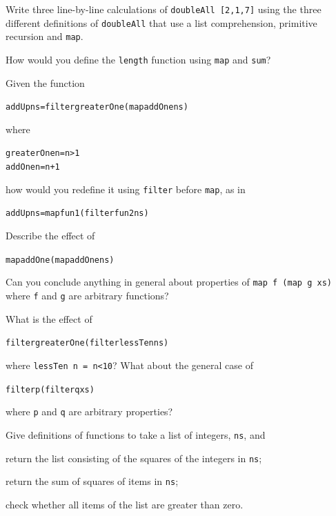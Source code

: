 \begin{exercises}

\item
Write three line-by-line calculations of \texttt{doubleAll [2,1,7]} using
the three different definitions of \texttt{doubleAll} that use a list
comprehension, primitive recursion and \texttt{map}.

\item
How would you define the \texttt{length} function using \texttt{map} and
\texttt{sum}?


\item
Given the function
\begin{alltt}
addUp ns = filter greaterOne (map addOne ns)
\end{alltt}
where
\begin{alltt}
greaterOne n = n>1
addOne n     = n+1
\end{alltt}
how would you redefine it using \texttt{filter} before \texttt{map}, as
in
\begin{alltt} 
addUp ns = map fun1 (filter fun2 ns)
\end{alltt}

\item
Describe the effect of 
\begin{alltt}
map addOne (map addOne ns) 
\end{alltt}
Can you conclude anything in general about properties of
\texttt{map f (map g xs)}
where \texttt{f} and \texttt{g} are arbitrary functions?

\item
What is the effect of 
\begin{alltt}
filter greaterOne (filter lessTen ns)
\end{alltt}
where \texttt{lessTen n = n<10}? What about the general case of
\begin{alltt}
filter p (filter q xs)
\end{alltt}
where \texttt{p} and \texttt{q} are arbitrary properties?

\item
Give definitions of functions to take a list of integers, \texttt{ns}, and
\begin{titemize}
\item return the list consisting of the squares of the integers in \texttt{ns};
\item return the sum of squares of items in \texttt{ns};
\item check whether all items of the list are greater than zero.
\end{titemize}


\end{exercises}
